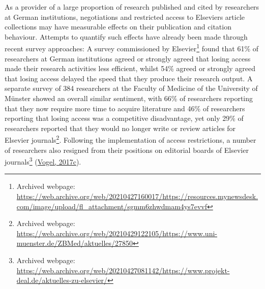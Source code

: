 \documentclass[
]{article}
\begin{document}
As a provider of a large proportion of research published and cited by researchers at German institutions, negotiations and restricted access to Elsevier\textquotesingle s article collections may have measurable effects on their publication and citation behaviour. Attempts to quantify such effects have already been made through recent survey approaches: A survey commissioned by Elsevier\footnote{Archived webpage: \url{https://web.archive.org/web/20210427160017/https://resources.mynewsdesk.com/image/upload/fl_attachment/sgmm6zhwdmam4ys7evvf}} found that 61\% of researchers at German institutions agreed or strongly agreed that losing access made their research activities less efficient, whilst 54\% agreed or strongly agreed that losing access delayed the speed that they produce their research output. A separate survey of 384 researchers at the Faculty of Medicine of the University of Münster showed an overall similar sentiment, with 66\% of researchers reporting that they now require more time to acquire literature and 46\% of researchers reporting that losing access was a competitive disadvantage, yet only 29\% of researchers reported that they would no longer write or review articles for Elsevier journals\footnote{Archived webpage: \url{https://web.archive.org/web/20210429122105/https://www.uni-muenster.de/ZBMed/aktuelles/27850}}. Following the implementation of access restrictions, a number of researchers also resigned from their positions on editorial boards of Elsevier journals\footnote{Archived webpage: \url{https://web.archive.org/web/20210427081142/https://www.projekt-deal.de/aktuelles-zu-elsevier/}} (\href{https://doi.org/10.1126/science.aar2142}{Vogel, 2017c}).
\end{document}
